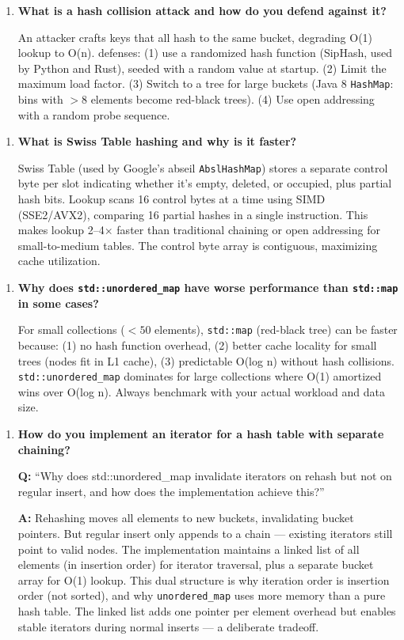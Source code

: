 \begin{enumerate}
\item \textbf{What is a hash collision attack and how do you defend against it?}

An attacker crafts keys that all hash to the same bucket, degrading O(1) lookup to O(n). defenses: (1) use a randomized hash function (SipHash, used by Python and Rust), seeded with a random value at startup. (2) Limit the maximum load factor. (3) Switch to a tree for large buckets (Java 8 \texttt{HashMap}: bins with $>8$ elements become red-black trees). (4) Use open addressing with a random probe sequence.
\end{enumerate}

\begin{enumerate}
\item \textbf{What is Swiss Table hashing and why is it faster?}

Swiss Table (used by Google's abseil \texttt{AbslHashMap}) stores a separate control byte per slot indicating whether it's empty, deleted, or occupied, plus partial hash bits. Lookup scans 16 control bytes at a time using SIMD (SSE2/AVX2), comparing 16 partial hashes in a single instruction. This makes lookup 2--4$\times $ faster than traditional chaining or open addressing for small-to-medium tables. The control byte array is contiguous, maximizing cache utilization.
\end{enumerate}

\begin{enumerate}
\item \textbf{Why does \texttt{std::unordered\_map} have worse performance than \texttt{std::map} in some cases?}

For small collections ($<50$ elements), \texttt{std::map} (red-black tree) can be faster because: (1) no hash function overhead, (2) better cache locality for small trees (nodes fit in L1 cache), (3) predictable O(log n) without hash collisions. \texttt{std::unordered\_map} dominates for large collections where O(1) amortized wins over O(log n). Always benchmark with your actual workload and data size.
\end{enumerate}

\begin{enumerate}
\item \textbf{How do you implement an iterator for a hash table with separate chaining?}

\textbf{Q:} ``Why does std::unordered\_map invalidate iterators on rehash but not on regular insert, and how does the implementation achieve this?''

\textbf{A:} Rehashing moves all elements to new buckets, invalidating bucket pointers. But regular insert only appends to a chain --- existing iterators still point to valid nodes. The implementation maintains a linked list of all elements (in insertion order) for iterator traversal, plus a separate bucket array for O(1) lookup. This dual structure is why iteration order is insertion order (not sorted), and why \texttt{unordered\_map} uses more memory than a pure hash table. The linked list adds one pointer per element overhead but enables stable iterators during normal inserts --- a deliberate tradeoff.
\end{enumerate}

